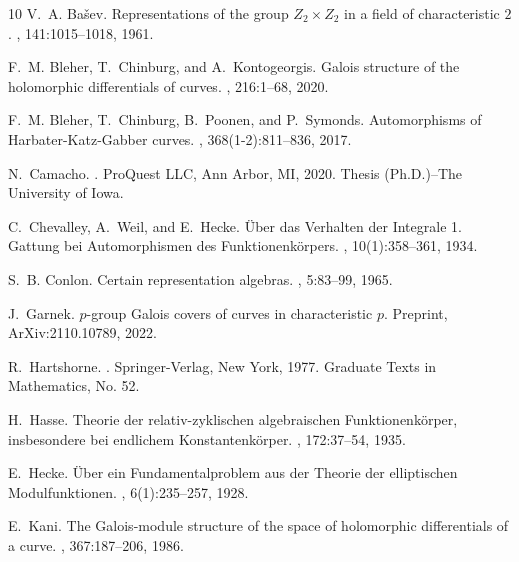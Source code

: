 \documentclass{amsart}
\numberwithin{equation}{section}
\numberwithin{table}{section}
\theoremstyle{plain}
\theoremstyle{definition}
\theoremstyle{remark}
\begin{document}

\begin{thebibliography}{10}
V.~A. Ba\v{s}ev.
\newblock Representations of the group {$Z_{2}\times Z_{2}$} in a field of
  characteristic {$2$}.
, 141:1015--1018, 1961.

F.~M. Bleher, T.~Chinburg, and A.~Kontogeorgis.
\newblock Galois structure of the holomorphic differentials of curves.
, 216:1--68, 2020.

F.~M. Bleher, T.~Chinburg, B.~Poonen, and P.~Symonds.
\newblock Automorphisms of {H}arbater-{K}atz-{G}abber curves.
, 368(1-2):811--836, 2017.

N.~Camacho.
.
\newblock ProQuest LLC, Ann Arbor, MI, 2020.
\newblock Thesis (Ph.D.)--The University of Iowa.

C.~Chevalley, A.~Weil, and E.~Hecke.
\newblock \"{U}ber das {V}erhalten der {I}ntegrale 1. {G}attung bei
  {A}utomorphismen des {F}unktionenk\"orpers.
, 10(1):358--361, 1934.

S.~B. Conlon.
\newblock Certain representation algebras.
, 5:83--99, 1965.

J.~Garnek.
\newblock $p$-group {G}alois covers of curves in characteristic $p$.
\newblock Preprint, ArXiv:2110.10789, 2022.

R.~Hartshorne.
.
\newblock Springer-Verlag, New York, 1977.
\newblock Graduate Texts in Mathematics, No. 52.

H.~Hasse.
\newblock Theorie der relativ-zyklischen algebraischen {F}unktionenk\"{o}rper,
  insbesondere bei endlichem {K}onstantenk\"{o}rper.
, 172:37--54, 1935.

E.~Hecke.
\newblock \"{U}ber ein {F}undamentalproblem aus der {T}heorie der elliptischen
  {M}odulfunktionen.
, 6(1):235--257, 1928.

E.~Kani.
\newblock The {G}alois-module structure of the space of holomorphic
  differentials of a curve.
, 367:187--206, 1986.


\end{thebibliography}
\end{document}
